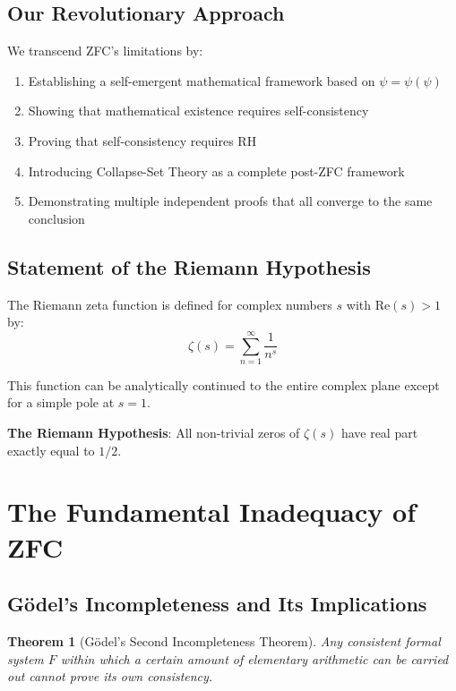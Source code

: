\documentclass[12pt]{article}
\newtheorem{theorem}{Theorem}[section]
\begin{document}
\subsection{Our Revolutionary Approach}

We transcend ZFC's limitations by:
\begin{enumerate}
\item Establishing a self-emergent mathematical framework based on $\psi = \psi(\psi)$
\item Showing that mathematical existence requires self-consistency
\item Proving that self-consistency requires RH
\item Introducing Collapse-Set Theory as a complete post-ZFC framework
\item Demonstrating multiple independent proofs that all converge to the same conclusion
\end{enumerate}

\subsection{Statement of the Riemann Hypothesis}

The Riemann zeta function is defined for complex numbers $s$ with $\text{Re}(s) > 1$ by:
\begin{equation}
\zeta(s) = \sum_{n=1}^{\infty} \frac{1}{n^s}
\end{equation}

This function can be analytically continued to the entire complex plane except for a simple pole at $s = 1$.

\textbf{The Riemann Hypothesis}: All non-trivial zeros of $\zeta(s)$ have real part exactly equal to $1/2$.

\section{The Fundamental Inadequacy of ZFC}

\subsection{Gödel's Incompleteness and Its Implications}

\begin{theorem}[Gödel's Second Incompleteness Theorem]
Any consistent formal system $F$ within which a certain amount of elementary arithmetic can be carried out cannot prove its own consistency.
\end{theorem}
\end{document}
